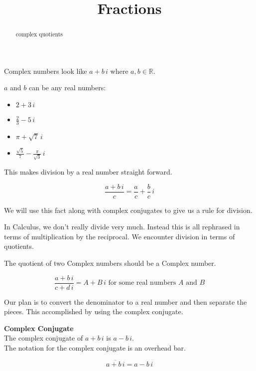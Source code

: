 \documentclass{ximera}
\title{Fractions}
\begin{document}
\begin{abstract}
complex quotients
\end{abstract}
\maketitle




Complex numbers look like $a + b \, i$ where $a, b \in \mathbb{R}$.


$a$ and $b$ can be any real numbers:



\begin{itemize}
	\item $2 + 3 \, i$
	\item $\frac{2}{3} - 5 \, i$
	\item $\pi + \sqrt{7} \, i$
	\item $\frac{\sqrt{5}}{7} - \frac{\pi}{\sqrt{3}} \, i$
\end{itemize}



This makes division by a real number straight forward.




\[
\frac{a + b \, i}{c} = \frac{a}{c} + \frac{b}{c} \, i
\]





We will use this fact along with complex conjugates to give us a rule for division.



In Calculus, we don't really divide very much.  Instead this is all rephrased in terms of multiplication by the reciprocal.  We encounter division in terms of quotients.


The quotient of two Complex numbers should be a Complex number.

\[
\frac{a + b \, i}{c + d \, i}  = A + B \, i  \text{ for some real numbers } A \text{ and } B
\]


Our plan is to convert the denominator to a real number and then separate the pieces.  This accomplished by using the complex conjugate.

\begin{definition}  \textbf{\textcolor{green!50!black}{Complex Conjugate}} \\


The complex conjugate of $a + b \, i$ is $a - b \, i$. \\


The notation for the complex conjugate is an overhead bar.

\[
\overline{a + b \, i} = a - b \, i
\]


\end{definition}
\end{document}
